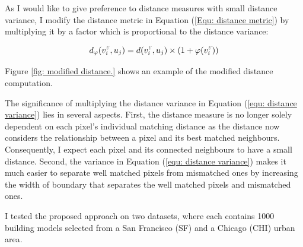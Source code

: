 \documentclass{iitthesis}
\begin{document}
As I would like to give preference to distance measures with small distance variance, I modify the distance metric in Equation (\ref{Equ: distance metric}) by multiplying it by a factor which is proportional to the distance variance:

\begin{equation}
d_{\varphi}(v_i^{\scalebox{.5}{\textit{U}}}, u_j)=d(v_i^{\scalebox{.5}{\textit{U}}}, u_j)\times(1+\varphi(v_i^{\scalebox{.5}{\textit{U}}}))
\label{equ: distance variance}
\end{equation}  

Figure \ref{fig: modified distance.} shows an example of the modified distance computation.

The significance of multiplying the distance variance in Equation (\ref{equ: distance variance}) lies in several aspects. First, the distance measure is no longer solely dependent on each pixel's individual matching distance as the distance now considers the relationship between a pixel and its best matched neighbours. Consequently, I expect each pixel and its connected neighbours to have a small distance. Second, the variance in Equation (\ref{equ: distance variance}) makes it much easier to separate well matched pixels from mismatched ones by increasing the width of boundary that separates the well matched pixels and mismatched ones.

I tested the proposed approach on two datasets, where each contains 1000 building models selected from a San Francisco (SF) and a Chicago (CHI) urban area.
\end{document}

